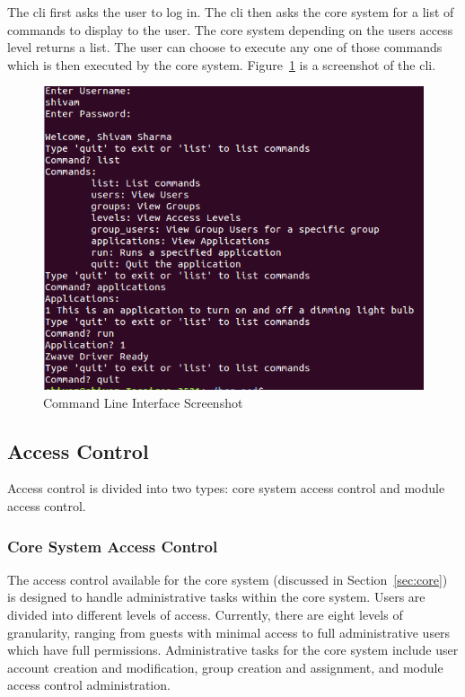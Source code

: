 The cli first asks the user to log in. The cli then asks the core system for a
list of commands to display to the user. The core system depending on the users
access level returns a list. The user can choose to execute any one of those
commands which is then executed by the core system. Figure~\ref{Fig:cli} is a 
screenshot of the cli.
\begin{figure}[tbh]                                                             
    \centering                                                                  
    \includegraphics[width=1.0\columnwidth]{figs/cli.png}                
    \caption{Command Line Interface Screenshot}                                                      
    \label{Fig:cli}                                                            
\end{figure} 
\subsection{Access Control}
\label{sec:access}
Access control is divided into two types: core system access control and module
access control.
\subsubsection{Core System Access Control}
The access control available for the core system (discussed in
Section~\ref{sec:core}) is designed to handle administrative tasks within the
core system. Users are divided into different levels of access. Currently, there
are eight levels of granularity, ranging from guests with minimal access to
full administrative users which have full permissions. Administrative tasks for
the core system include user account creation and modification, group creation
and assignment, and module access control administration.

